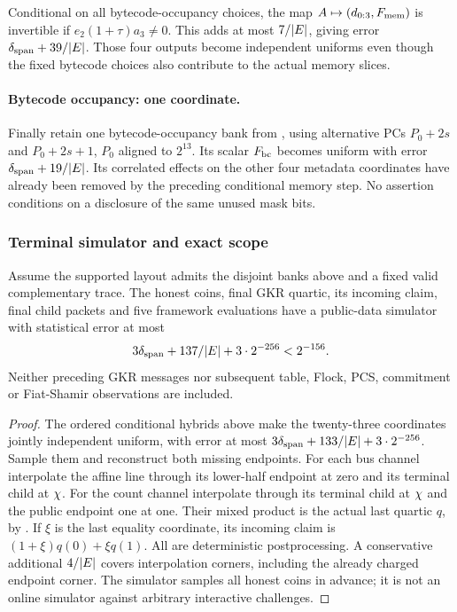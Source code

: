 Conditional on all bytecode-occupancy choices, the map $A\mapsto(d_{0:3},F_{\rm mem})$ is invertible if $e_2(1+\tau)a_3\ne0$. This adds at most $7/|E|$, giving error $\delta_{\rm span}+39/|E|$. Those four outputs become independent uniforms even though the fixed bytecode choices also contribute to the actual memory slices.

\paragraph{Bytecode occupancy: one coordinate.} Finally retain one bytecode-occupancy bank from , using alternative PCs $P_0+2s$ and $P_0+2s+1$, $P_0$ aligned to $2^{13}$. Its scalar $F_{\rm bc}$ becomes uniform with error $\delta_{\rm span}+19/|E|$. Its correlated effects on the other four metadata coordinates have already been removed by the preceding conditional memory step. No assertion conditions on a disclosure of the same unused mask bits.

\subsubsection{Terminal simulator and exact scope}

\begin{theorem}
Assume the supported layout admits the disjoint banks above and a fixed valid complementary trace. The honest coins, final GKR quartic, its incoming claim, final child packets and five framework evaluations have a public-data simulator with statistical error at most
\[
 3\delta_{\rm span}+137/|E|+3\cdot2^{-256}<2^{-156}.
\]
Neither preceding GKR messages nor subsequent table, Flock, PCS, commitment or Fiat-Shamir observations are included.
\end{theorem}
\begin{proof}
The ordered conditional hybrids above make the twenty-three coordinates jointly independent uniform, with error at most $3\delta_{\rm span}+133/|E|+3\cdot2^{-256}$. Sample them and reconstruct both missing endpoints. For each bus channel interpolate the affine line through its lower-half endpoint at zero and its terminal child at $\chi$. For the count channel interpolate through its terminal child at $\chi$ and the public endpoint one at one. Their mixed product is the actual last quartic $q$, by . If $\xi$ is the last equality coordinate, its incoming claim is $(1+\xi)q(0)+\xi q(1)$. All are deterministic postprocessing. A conservative additional $4/|E|$ covers interpolation corners, including the already charged endpoint corner. The simulator samples all honest coins in advance; it is not an online simulator against arbitrary interactive challenges.
\end{proof}

